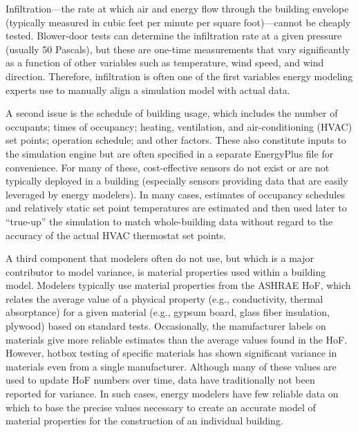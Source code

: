 \documentclass[preprint, review, 12pt]{elsarticle}
\begin{document}
Infiltration---the rate at which air and energy flow through the building envelope (typically measured in cubic feet per minute per square foot)---cannot be cheaply tested. Blower-door tests can determine the infiltration rate at a given pressure (usually 50 Pascals), but these are one-time measurements that vary significantly as a function of other variables such as temperature, wind speed, and wind direction. Therefore, infiltration is often one of the first variables energy modeling experts use to manually align a simulation model with actual data.

A second issue is the schedule of building usage, which includes the number of occupants; times of occupancy; heating, ventilation, and air-conditioning (HVAC) set points; operation schedule; and other factors. These also constitute inputs to the simulation engine but are often specified in a separate EnergyPlus file for convenience. For many of these, cost-effective sensors do not exist or are not typically deployed in a building (especially sensors providing data that are easily leveraged by energy modelers). In many cases, estimates of occupancy schedules and relatively static set point temperatures are estimated and then used later to ``true-up'' the simulation to match whole-building data without regard to the accuracy of the actual HVAC thermostat set points.

A third component that modelers often do not use, but which is a major contributor to model variance, is material properties used within a building model. Modelers typically use material properties from the ASHRAE HoF, which relates the average value of a physical property (e.g., conductivity, thermal absorptance) for a given material (e.g., gypsum board, glass fiber insulation, plywood) based on standard tests. Occasionally, the manufacturer labels on materials give more reliable estimates than the average values found in the HoF. However, hotbox testing of specific materials has shown significant variance in materials even from a single manufacturer. Although many of these values are used to update HoF numbers over time, data have traditionally not been reported for variance.  In such cases, energy modelers have few reliable data on which to base the precise values necessary to create an accurate model of material properties for the construction of an individual building.
\end{document}
